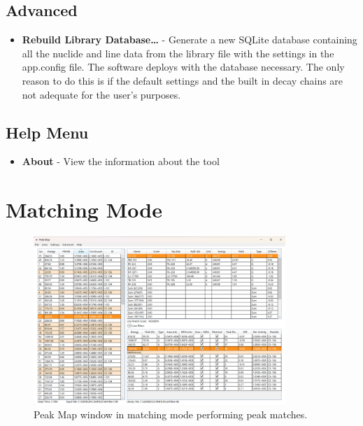 \documentclass[12pt,report,justified]{SANDreport}
\begin{document}
\subsection{Advanced}\label{sec:adv_menu}
\begin{itemize}
    \item \textbf{Rebuild Library Database\ldots} - Generate a new SQLite database containing all the nuclide
        and line data from the library file with the settings in the app.config file. The software deploys with
        the database necessary. The only reason to do this is if the default settings and the built in decay
        chains are not adequate for the user's purposes.
\end{itemize}
\subsection{Help Menu}\label{sec:help_menu}
\begin{itemize}
    \item \textbf{About} - View the information about the tool
\end{itemize}


\section{Matching Mode}\label{sec:match_mode}
\begin{figure}[h]
    \includegraphics[width=0.85\textwidth]{MainWindow.png}
    \centering
    \caption{Peak Map window in matching mode performing peak matches.}
    \label{fig:main_window}
\end{figure}
\end{document}

